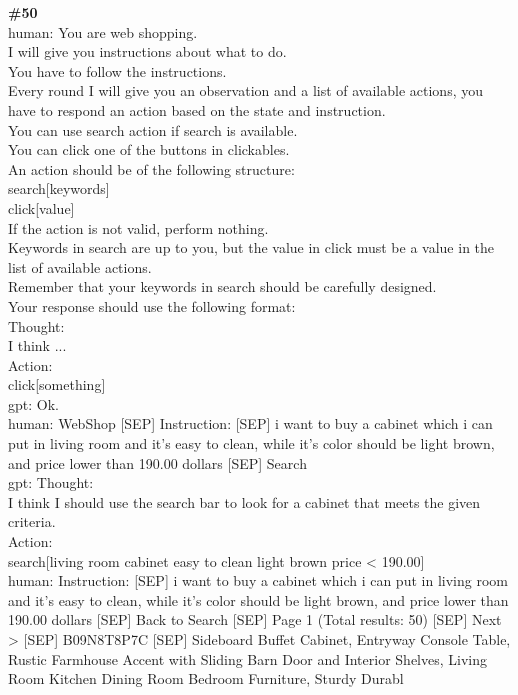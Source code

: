 \documentclass[10pt]{article}
\begin{document}
\begin{Form}
\begin{tcolorbox}[colback=convbg,colframe=itemframe,boxrule=0.8pt,arc=2pt,breakable,left=6pt,right=6pt,top=5pt,bottom=5pt]
{\footnotesize\textbf{\#50}}\\[3pt]
{\footnotesize human: You are web shopping. \\[2pt]
I will give you instructions about what to do. \\[2pt]
You have to follow the instructions. \\[2pt]
Every round I will give you an observation and a list of available actions, you have to respond an action based on the state and instruction. \\[2pt]
You can use search action if search is available. \\[2pt]
You can click one of the buttons in clickables. \\[2pt]
An action should be of the following structure: \\[2pt]
search[keywords] \\[2pt]
click[value] \\[2pt]
If the action is not valid, perform nothing. \\[2pt]
Keywords in search are up to you, but the value in click must be a value in the list of available actions. \\[2pt]
Remember that your keywords in search should be carefully designed. \\[2pt]
Your response should use the following format: \\[2pt]
Thought: \\[2pt]
I think ... \\[2pt]
Action: \\[2pt]
click[something] \\[2pt]
gpt: Ok. \\[2pt]
human: WebShop [SEP] Instruction: [SEP] i want to buy a cabinet which i can put in living room and it's easy to clean, while it's color should be light brown, and price lower than 190.00 dollars [SEP] Search \\[2pt]
gpt: Thought: \\[2pt]
I think I should use the search bar to look for a cabinet that meets the given criteria. \\[2pt]
Action: \\[2pt]
search[living room cabinet easy to clean light brown price < 190.00] \\[2pt]
human: Instruction: [SEP] i want to buy a cabinet which i can put in living room and it's easy to clean, while it's color should be light brown, and price lower than 190.00 dollars [SEP] Back to Search [SEP] Page 1 (Total results: 50) [SEP] Next > [SEP] B09N8T8P7C [SEP] Sideboard Buffet Cabinet, Entryway Console Table, Rustic Farmhouse Accent with Sliding Barn Door and Interior Shelves, Living Room Kitchen Dining Room Bedroom Furniture, Sturdy Durabl}

\end{tcolorbox}
\end{Form}
\end{document}
